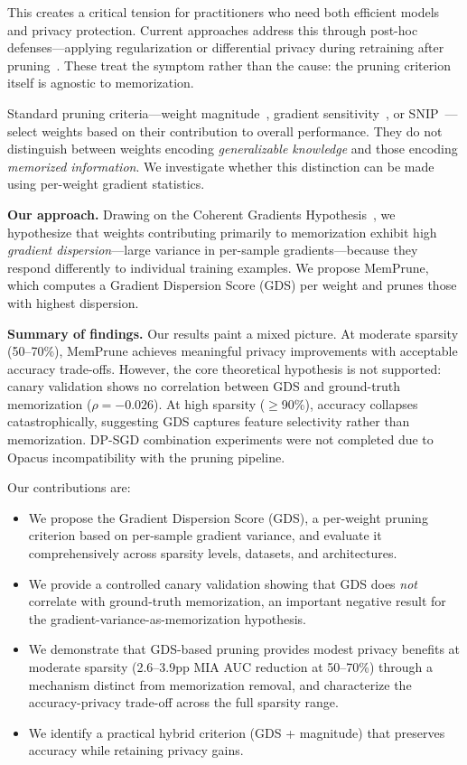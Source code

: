 \documentclass{article}
\begin{document}
This creates a critical tension for practitioners who need both efficient models and privacy protection. Current approaches address this through post-hoc defenses---applying regularization or differential privacy during retraining after pruning~\citep{shang2025wemem}. These treat the symptom rather than the cause: the pruning criterion itself is agnostic to memorization.

Standard pruning criteria---weight magnitude~\citep{han2015learning}, gradient sensitivity~\citep{molchanov2019importance}, or SNIP~\citep{lee2019snip}---select weights based on their contribution to overall performance. They do not distinguish between weights encoding \emph{generalizable knowledge} and those encoding \emph{memorized information}. We investigate whether this distinction can be made using per-weight gradient statistics.

\textbf{Our approach.} Drawing on the Coherent Gradients Hypothesis~\citep{chatterjee2020coherent}, we hypothesize that weights contributing primarily to memorization exhibit high \emph{gradient dispersion}---large variance in per-sample gradients---because they respond differently to individual training examples. We propose MemPrune, which computes a Gradient Dispersion Score (GDS) per weight and prunes those with highest dispersion.

\textbf{Summary of findings.} Our results paint a mixed picture. At moderate sparsity (50--70\%), MemPrune achieves meaningful privacy improvements with acceptable accuracy trade-offs. However, the core theoretical hypothesis is not supported: canary validation shows no correlation between GDS and ground-truth memorization ($\rho = -0.026$). At high sparsity ($\geq$90\%), accuracy collapses catastrophically, suggesting GDS captures feature selectivity rather than memorization. DP-SGD combination experiments were not completed due to Opacus incompatibility with the pruning pipeline.

Our contributions are:
\begin{itemize}
    \item We propose the Gradient Dispersion Score (GDS), a per-weight pruning criterion based on per-sample gradient variance, and evaluate it comprehensively across sparsity levels, datasets, and architectures.
    \item We provide a controlled canary validation showing that GDS does \emph{not} correlate with ground-truth memorization, an important negative result for the gradient-variance-as-memorization hypothesis.
    \item We demonstrate that GDS-based pruning provides modest privacy benefits at moderate sparsity (2.6--3.9pp MIA AUC reduction at 50--70\%) through a mechanism distinct from memorization removal, and characterize the accuracy-privacy trade-off across the full sparsity range.
    \item We identify a practical hybrid criterion (GDS + magnitude) that preserves accuracy while retaining privacy gains.
\end{itemize}
\end{document}
